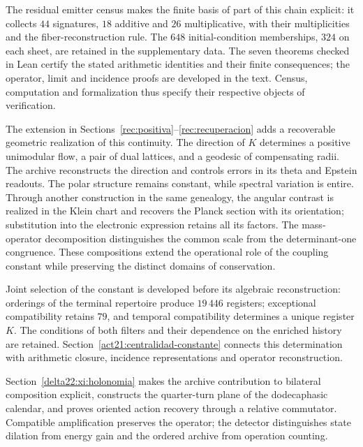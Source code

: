 The residual emitter census makes the finite basis of part of this chain explicit: it collects \(44\) signatures, \(18\) additive and \(26\) multiplicative, with their multiplicities and the fiber-reconstruction rule. The \(648\) initial-condition memberships, \(324\) on each sheet, are retained in the supplementary data. The seven theorems checked in Lean certify the stated arithmetic identities and their finite consequences; the operator, limit and incidence proofs are developed in the text. Census, computation and formalization thus specify their respective objects of verification.


The extension in Sections~\ref{rec:positiva}--\ref{rec:recuperacion} adds a recoverable geometric realization of this continuity. The direction of \(K\) determines a positive unimodular flow, a pair of dual lattices, and a geodesic of compensating radii. The archive reconstructs the direction and controls errors in its theta and Epstein readouts. The polar structure remains constant, while spectral variation is entire. Through another construction in the same genealogy, the angular contrast is realized in the Klein chart and recovers the Planck section with its orientation; substitution into the electronic expression retains all its factors. The mass-operator decomposition distinguishes the common scale from the determinant-one congruence. These compositions extend the operational role of the coupling constant while preserving the distinct domains of conservation.

\newpage %
Joint selection of the constant is developed before its algebraic
reconstruction: orderings of the terminal repertoire produce \(19\,446\)
registers; exceptional compatibility retains \(79\), and temporal
compatibility determines a unique register \(K\). The conditions of both
filters and their dependence on the enriched history are retained.
Section~\ref{act21:centralidad-constante} connects this determination with
arithmetic closure, incidence representations and operator reconstruction.

\par
Section~\ref{delta22:xi:holonomia} makes the archive contribution to bilateral composition explicit, constructs the quarter-turn plane of the dodecaphasic calendar, and proves oriented action recovery through a relative commutator. Compatible amplification preserves the operator; the detector distinguishes state dilation from energy gain and the ordered archive from operation counting.

